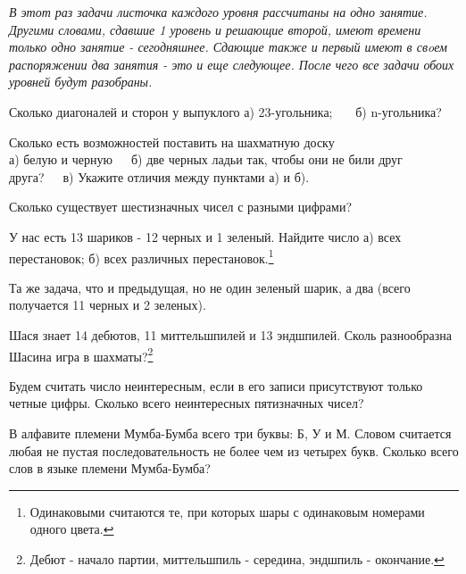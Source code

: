 
\textit{В этот раз задачи листочка каждого уровня  рассчитаны на одно занятие. Другими словами, сдавшие 1 уровень и решающие второй, имеют времени только одно занятие - сегодняшнее. Сдающие также и первый имеют в свoем распоряжении два занятия - это и еще следующее. После чего все задачи обоих уровней будут разобраны.}

\begin{thm}
	Сколько диагоналей и сторон у выпуклого  а) 23-угольника;~~~ б) n-угольника?
\end{thm}

\begin{thm}
	Сколько есть возможностей поставить на шахматную доску\\ а) белую и черную~~~б) две черных ладьи так, чтобы они не били друг друга?~~~в) Укажите отличия между пунктами а) и б).
\end{thm}

\begin{thm}
	Сколько существует шестизначных чисел с разными цифрами?
\end{thm}

\begin{thm}
	У нас есть 13 шариков - 12 черных и 1 зеленый. Найдите число а) всех перестановок; б) всех различных перестановок.\footnote{Одинаковыми считаются те, при которых шары с одинаковым номерами одного цвета.}
\end{thm}

\begin{thm}
	Та же задача, что и предыдущая, но не один зеленый шарик, а два (всего получается 11 черных и 2 зеленых).
\end{thm}

\begin{thm}
	Шася знает 14 дебютов, 11 миттельшпилей и 13 эндшпилей. Сколь разнообразна Шасина игра в шахматы?\footnote{Дебют - начало партии, миттельшпиль - середина, эндшпиль - окончание.}
\end{thm}



\begin{thm}	
	Будем считать число неинтересным, если в его записи присутствуют только четные цифры. Сколько всего неинтересных пятизначных чисел?
\end{thm}

\begin{thm}	
	В алфавите племени Мумба-Бумба всего три буквы: Б, У и М. Словом считается любая не пустая последовательность не более чем из четырех букв. Сколько всего слов в языке племени Мумба-Бумба?
\end{thm}

